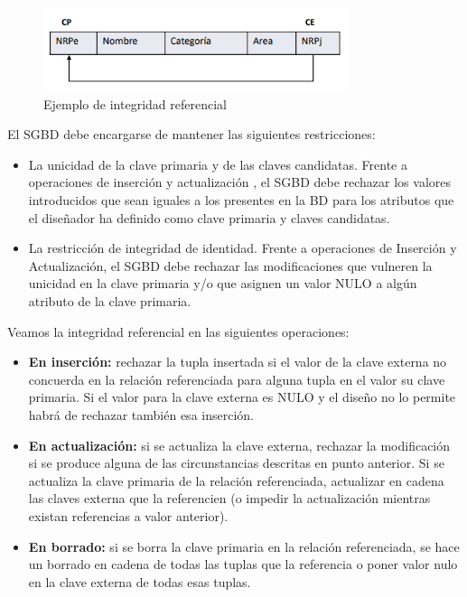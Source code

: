 \documentclass[a4paper,11pt]{article}
\begin{document}
\begin{itemize}
\begin{figure}[h]
\centering
\includegraphics[scale=1,width=0.8\textwidth]{ejemplo_integridad_referencial.png}
\caption{Ejemplo de integridad referencial}
\end{figure}
\end{itemize}

El SGBD debe encargarse de mantener las siguientes restricciones:

\begin{itemize}
\item La unicidad de la clave primaria y de las claves candidatas. Frente a operaciones de inserción y actualización , el SGBD debe rechazar los valores introducidos que sean iguales a los presentes en la BD para los atributos que el diseñador ha definido como clave primaria y claves candidatas.

\item La restricción de integridad de identidad. Frente a operaciones de Inserción y Actualización, el SGBD debe rechazar las modificaciones que vulneren la unicidad en la clave primaria y/o que asignen un valor NULO a algún atributo de la clave primaria.
\end{itemize}

Veamos la integridad referencial en las siguientes operaciones:

\begin{itemize}
\item \textbf{En inserción:} rechazar la tupla insertada si el valor de la clave externa no concuerda en la relación referenciada para alguna tupla en el valor su clave primaria. Si el valor para la clave externa es NULO y el diseño no lo permite habrá de rechazar también esa inserción.

\item \textbf{En actualización:} si se actualiza la clave externa, rechazar la modificación si se produce alguna de las circunstancias descritas en punto anterior. Si se actualiza la clave primaria de la relación referenciada, actualizar en cadena las claves externa que la referencien (o impedir la actualización mientras existan referencias a valor anterior).

\item \textbf{En borrado:} si se borra la clave primaria en la relación referenciada, se hace un borrado en cadena de todas las tuplas que la referencia o poner valor nulo en la clave externa de todas esas tuplas.
\end{itemize}
\end{document}
